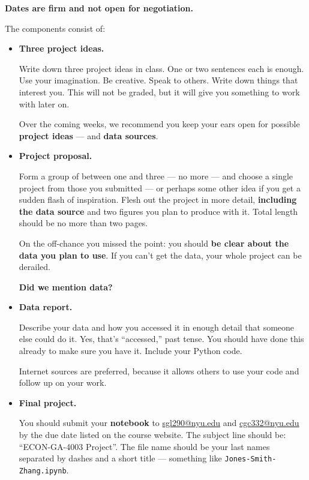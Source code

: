 \documentclass[11pt]{article}
\begin{document}
{\bf Dates are firm and not open for negotiation.}


The components consist of:
\begin{itemize}

\item {\bf Three project ideas.}

Write down three project ideas in class. One or two sentences each is enough.
Use your imagination.  Be creative.  Speak to others. Write down things that
interest you. This will not be graded, but it will give you something to work
with later on.

Over the coming weeks, we recommend you keep your ears open for possible
{\bf project ideas} --- and {\bf data sources\/}.

\item{\bf Project proposal.}

Form a group of between one and three --- no more --- and choose a single
project from those you submitted --- or perhaps some other idea if you get a
sudden flash of inspiration. Flesh out the project in more detail, {\bf
including the data source\/} and two figures you plan to produce with it. Total
length should be no more than two pages.

On the off-chance you missed the point:  you should {\bf be clear about the data
you plan to use\/}. If you can't get the data, your whole project can be
derailed.

{\bf Did we mention data?}

\item {\bf Data report.}

Describe your data and how you accessed it in enough detail that someone else
could do it. Yes, that's ``accessed,'' past tense.  You should have done this
already to make sure you have it. Include your Python code.

Internet sources are preferred, because it allows others to use your code and
follow up on your work.

\item {\bf Final project.}

You should submit your {\bf notebook\/} to
\href{mailto:sgl290@nyu.edu}{sgl290@nyu.edu} and
\href{mailto:cgc332@nyu.edu}{cgc332@nyu.edu} by the due date listed
on the course website. The subject line should be:  ``ECON-GA-4003 Project''. The
file name should be your last names separated by dashes and a short title ---
something like {\tt Jones-Smith-Zhang.ipynb}.


\end{itemize}
\end{document}
